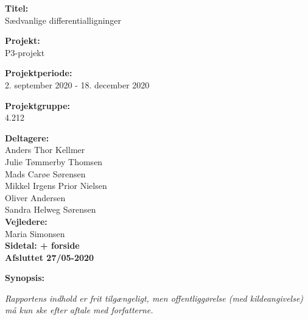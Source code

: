 \begin{minipage}[t]{0.48\textwidth}
\textbf{Titel:} \\[5pt]\hspace{2ex}
{Sædvanlige differentialligninger}
\bigskip

\textbf{Projekt:} \\[5pt]\hspace{2ex}
P3-projekt
\bigskip

\textbf{Projektperiode:} \\[5pt]\hspace{2ex}
2. september 2020 - 18. december 2020
\bigskip

\textbf{Projektgruppe:} \\[5pt]\hspace{2ex}
4.212
\bigskip

\textbf{Deltagere:} \\[5pt]%
Anders Thor Kellmer\\%
Julie Tømmerby Thomsen\\%
Mads Carøe Sørensen\\%
Mikkel Irgens Prior Nielsen\\%
Oliver Andersen \\
Sandra Helweg Sørensen\\%

\textbf{Vejledere:} \\[5pt]%
Maria Simonsen \\

\textbf{Sidetal: \pageref{LastPage} + forside} \\ 
\textbf{Afsluttet 27/05-2020}

\end{minipage}
\hfill
\begin{minipage}[t]{0.5\textwidth}
\textbf{Synopsis:} \\[5pt]

\end{minipage}
\hspace*{2ex}

\vfill

{\footnotesize \textit{Rapportens indhold er frit tilgængeligt, men offentliggørelse (med kildeangivelse) må kun ske efter aftale med forfatterne.}}

\pagebreak
\phantom{a}
\thispagestyle{empty}
